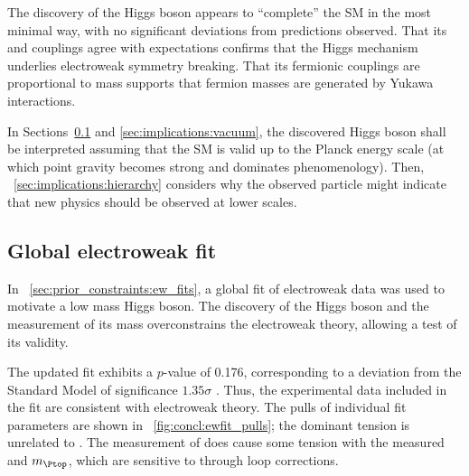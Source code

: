
The discovery of the Higgs boson appears to ``complete'' the SM in the most minimal way, 
with no significant deviations from predictions observed. That its 
\HepProcess{\PHiggs\PW\PW} and \HepProcess{\PHiggs\PZ\PZ} couplings agree with 
expectations confirms that the Higgs mechanism underlies electroweak symmetry breaking. 
That its fermionic couplings are proportional to mass supports that fermion masses are 
generated by Yukawa interactions.

In Sections~\ref{sec:implications:ewfit} and \ref{sec:implications:vacuum}, the 
discovered Higgs boson shall be interpreted assuming that the SM is valid up to the 
Planck energy scale (at which point gravity becomes strong and dominates phenomenology). 
Then, \Section~\ref{sec:implications:hierarchy} considers why the observed particle might 
indicate that new physics should be observed at lower scales.



\subsection{Global electroweak fit}
\label{sec:implications:ewfit}

In \Section~\ref{sec:prior_constraints:ew_fits}, a global fit of electroweak data was 
used to motivate a low mass Higgs boson. The discovery of the Higgs boson and the 
measurement of its mass overconstrains the electroweak theory, allowing a test of its 
validity. 

The updated fit exhibits a $p$-value of 0.176, corresponding to a deviation from the 
Standard Model of significance $1.35\sigma$ \cite{Gfitter:2013}. Thus, the experimental 
data included in the fit are consistent with electroweak theory. The pulls of individual 
fit parameters are shown in \Figure~\ref{fig:concl:ewfit_pulls}; the dominant tension is 
unrelated to \mH. The measurement of \mH does cause some tension with the measured \mW 
and $m_{\Ptop}$, which are sensitive to \mH through loop corrections.

